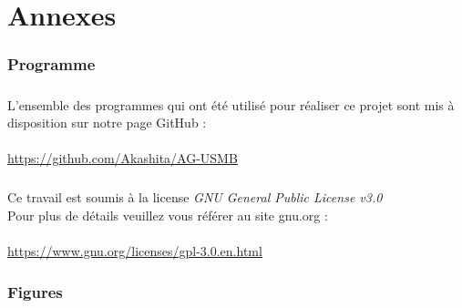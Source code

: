 \documentclass[12pt]{report}
\begin{document}
  \appendix

  \nocite{*} %
  
  

  \chapter{Annexes}
    \subsection{Programme}
      \paragraph{}
      L'ensemble des programmes qui ont été utilisé pour réaliser ce projet sont mis à disposition sur notre page GitHub : \\\\
      \url{https://github.com/Akashita/AG-USMB}

      \paragraph{}
      Ce travail est soumis à la license \emph{GNU General Public License v3.0}\\ %
      Pour plus de détails veuillez vous référer au site gnu.org : \\\\
      \url{https://www.gnu.org/licenses/gpl-3.0.en.html}

    \subsection{Figures}
\end{document}
